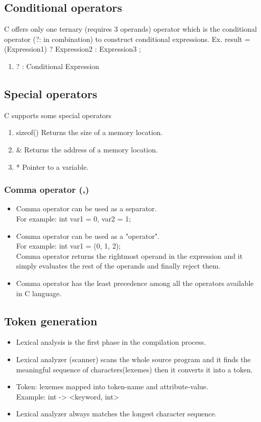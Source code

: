 \subsection{Conditional operators}
C offers only one ternary (requires 3 operands) operator which is the conditional operator (?: in combination) to construct conditional expressions. Ex. result = (Expression1) ? Expression2 : Expression3 ;

\begin{enumerate}
    \item ? :	 Conditional Expression
\end{enumerate}

\subsection{Special operators}   
C supports some special operators
\begin{enumerate}
    \item sizeof()	 Returns the size of a memory location.
    \item \&	     Returns the address of a memory location.
    \item *	         Pointer to a variable.
\end{enumerate}

\subsubsection{Comma operator (,)} 
\begin{itemize}
    \item Comma operator can be used as a separator.\\ For example: int var1 = 0, var2 = 1;
    \item Comma operator can be used as a "operator".\\ For example: int var1 = (0, 1, 2);\\ Comma operator returns the rightmost operand in the expression and it simply evaluates the rest of the operands and finally reject them.
    \item Comma operator has the least precedence among all the operators available in C language.
\end{itemize}


\subsection{Token generation}
\begin{itemize}
    \item Lexical analysis is the first phase in the compilation process.
    \item Lexical analyzer (scanner) scans the whole source program and it finds the meaningful sequence of characters(lexemes) then it converts it into a token.
    \item Token: lexemes mapped into token-name and attribute-value.\\ Example: int -> <keyword, int>
    \item Lexical analyzer always matches the longest character sequence.
\end{itemize}


